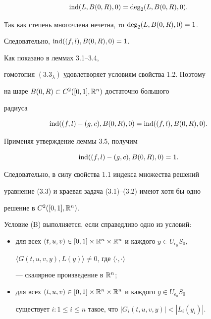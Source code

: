 \begin{pf}
\begin{pf}
$$


\Ind (L, B(0, R), 0)= \Deg_2 (L, B(0, R), 0).


$$


Так как степень многочлена нечетна, то $\operatorname{deg}_2 (L, B(0, R), 0)=1$.


Следовательно, $\Ind((f, l),\linebreak B(0, R), 0)=1$.


\end{pf}





Как показано в леммах 3.1--3.4,


гомотопия $(3.3_\lambda)$ удовлетворяет условиям свойства 1.2. Поэтому 


на шаре $B(0, R)\subset C^2([0,1], {\Bbb R}^n)$ достаточно большого


радиуса


$$


\Ind((f, l)-(g, c), B(0, R), 0) = \Ind ((f, l), B(0, R), 0).


$$


Применяя утверждение леммы 3.5, получим


$$


\Ind ((f, l) - (g, c), B(0, R), 0) = 1.


$$


Следовательно, в силу свойства 1.1 индекса множества решений


уравнение (3.3) и краевая задача (3.1)--(3.2) имеют хотя бы одно


решение в $C^2([0,1], {\Bbb R}^n)$.


\end{pf}





\begin{notes}


Условие (B) выполняется, если справедливо одно из условий:


\begin{itemize}


\item[(B$'$)] для всех $(t,u,v)\in [0,1]\times {\Bbb R}^n\times 


{\Bbb R}^n $ и каждого $y\in U_{\epsilon_0}S_0$,


$\langle G(t,u,v,y), L(y)\rangle\neq 0$, где $\langle\cdot, \cdot\rangle$ 


--- скалярное произведение в ${\Bbb R}^n$;


\item[(B$''$)] 


для всех $(t,u,v)\in [0,1]\times {\Bbb R}^n\times


{\Bbb R}^n$ и каждого $y\in U_{\epsilon_0}S_0$ 


существует $i: 1\leq i\leq n$ такое, что $|G_i(t,u,v,y)|<|L_i(y_i)|$.


\end{itemize}


\end{notes}





